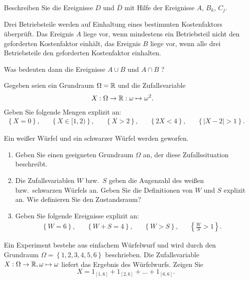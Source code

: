 Beschreiben Sie die Ereignisse $D$ und $\overline{D}$ mit Hilfe der Ereignisse
$A$, $B_k$, $C_j$.


Drei Betriebsteile werden auf Einhaltung eines bestimmten Kostenfaktors
überprüft. Das Ereignis $A$ liege vor, wenn mindestens ein Betriebsteil nicht
den geforderten Kostenfaktor einhält, das Ereignis $B$ liege vor, wenn alle
drei Betriebsteile den geforderten Kostenfaktor einhalten.

Was bedeuten dann die Ereignisse $A\cup B$ und $A\cap B$ ?

Gegeben seien ein Grundraum $\Omega= \mathbb R$ und die Zufallsvariable
\begin{align*}
    X &: \Omega \to \mathbb R : \omega \mapsto \omega^2.
\end{align*}
Geben Sie folgende Mengen explizit an:
\begin{align*}
    \left\{ X = 0 \right\}, && \left\{ X \in [1,2) \right\}, && \left\{ X > 2 \right\}, && 
    \left\{ 2X < 4 \right\}, && \left\{ |X-2| > 1 \right\}.
\end{align*}

Ein weißer Würfel und ein schwarzer Würfel werden geworfen. 
\begin{enumerate}
    \item Geben Sie einen geeigneten Grundraum $\Omega$ an, der diese 
        Zufallssituation beschreibt.
    \item Die Zufallsvariablen $W$ bzw.\ $S$ geben die Augenzahl des weißen bzw.\ 
        schwarzen Würfels an. Geben Sie die Definitionen von $W$ und $S$ explizit an.
        Wie definieren Sie den Zustandsraum?

    \item Geben Sie folgende Ereignisse explizit an:
        \begin{align*}
            \left\{ W = 6 \right\}, && \left\{ W+S = 4 \right\}, && \left\{ W > S \right\}, && \left\{ \frac{W}{S} > 1 \right\}.
        \end{align*}
\end{enumerate}

Ein Experiment bestehe aus einfachem Würfelwurf und wird durch den Grundraum
$\Omega = \left\{ 1,2,3,4,5,6 \right\}$ beschrieben. Die Zufallsvariable $X:
\Omega \to \mathbb R, \omega \mapsto \omega$ liefert das Ergebnis des Würfelwurfs.
Zeigen Sie
\begin{equation*}
    X = 1_{ [1,6] } + 1_{[2,6]} + \dots + 1_{ [6,6] }.
\end{equation*}

